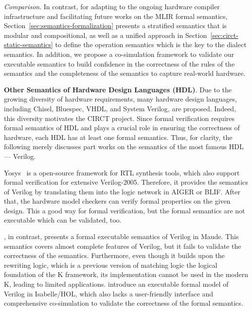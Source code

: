 \smallskip
\textit{Comparison}. In contrast, for adapting to the ongoing hardware compiler infrastructure and facilitating future works on the MLIR formal semantics, Section~\ref{sec:semantics-formalization} presents a stratified semantics that is modular and compositional, as well as a unified approach in Section~\ref{sec:circt-static-semantics} to define the operation semantics which is the key to the dialect semantics. In addition, we propose a co-simulation framework to validate our executable semantics to build confidence in the correctness of the rules of the semantics and the completeness of the semantics to capture real-world hardware.


\smallskip
\textbf{Other Semantics of Hardware Design Languages (HDL)}. Due to the growing diversity of hardware requirements, many hardware design languages, including Chisel, Bluespec, VHDL, and System Verilog, are proposed. Indeed, this diversity motivates the CIRCT project. Since formal verification requires formal semantics of HDL and plays a crucial role in ensuring the correctness of hardware, each HDL has at least one formal semantics. Thus, for clarity, the following merely discusses part works on the semantics of the most famous HDL --- Verilog.

Yosys~\cite{wolfYosysaFreeVerilog2013} is a open-source framework for RTL synthesis tools, which also support formal verification for extensive Verilog-2005. Therefore, it provides the semantics of Verilog by translating them into the logic network in AIGER or BLIF. After that, the hardware model checkers can verify formal properties on the given design. This a good way for formal verification, but the formal semantics are not executable which can be validated, too.  

\citet{meredithFormalExecutableSemantics2010}, in contrast, presents a formal executable semantics of Verilog in Maude. This semantics covers almost complete features of Verilog, but it fails to validate the correctness of the semantics. Furthermore, even though it builds upon the rewriting logic, which is a previous version of matching logic the logical foundation of the K framework, its implementation cannot be used in the modern K, leading to limited applications. \citet{khanVeriFormalExecutableFormal2017} introduce an executable formal model of Verilog in Isabelle/HOL, which also lacks a user-friendly interface and comprehensive co-simulation to validate the correctness of the formal semantics. 

